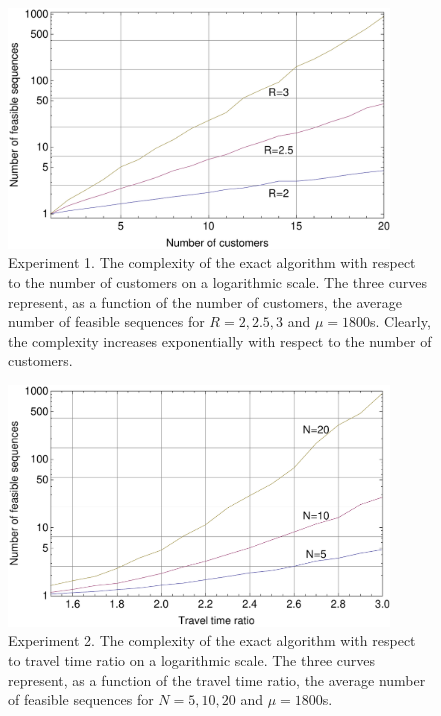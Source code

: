 \documentclass[dissertation,draft*]{aaltoseries}
\begin{document}
\begin{figure}[ht]
\begin{center}
\includegraphics[width=0.9\textwidth]{nvertailu01.pdf}
\caption{Experiment 1. The complexity of the exact algorithm with respect to the number of customers on a logarithmic scale. 
The three curves represent, as a function of the number of customers, the average number of feasible sequences 
for $R=2,2.5,3$ and $\mu=1800$s. Clearly, the complexity increases exponentially with respect
to the number of customers.}
\label{nvertailu01}
\end{center}
\end{figure}



\begin{figure}[ht]
\begin{center}
\includegraphics[width=0.9\textwidth]{ttivertailu01.pdf}
\caption{Experiment 2. The complexity of the exact algorithm with respect to travel time ratio on a logarithmic scale. 
The three curves represent, as a function of the travel time ratio, the average number of feasible sequences
for $N=5,10,20$ and $\mu = 1800$s.}
\label{ttivertailu01}
\end{center}
\end{figure}
\end{document}

